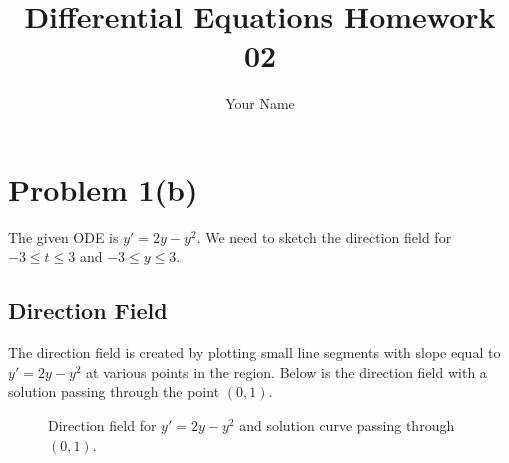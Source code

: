 \documentclass{article}
\title{Differential Equations Homework 02}
\author{Your Name}
\date{}
\begin{document}
\maketitle

\section*{Problem 1(b)}

The given ODE is \( y' = 2y - y^2 \). We need to sketch the direction field for \( -3 \leq t \leq 3 \) and \( -3 \leq y \leq 3 \).

\subsection*{Direction Field}

The direction field is created by plotting small line segments with slope equal to \( y' = 2y - y^2 \) at various points in the region. Below is the direction field with a solution passing through the point \( (0,1) \).

\begin{figure}[h!]
    \centering
    \caption{Direction field for \( y' = 2y - y^2 \) and solution curve passing through \( (0, 1) \).}
\end{figure}
\end{document}
